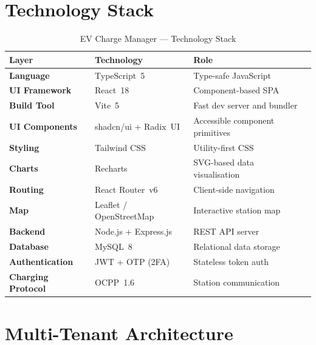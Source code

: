 \documentclass[12pt,a4paper]{report}
\begin{document}
\section{Technology Stack}

\begin{table}[h!]
  \centering
  \caption{EV Charge Manager --- Technology Stack}
  \label{tab:tech-stack}
  \renewcommand{\arraystretch}{1.3}
  \begin{tabular}{>{\bfseries}p{3.8cm} p{4cm} p{5.5cm}}
    \toprule
    Layer              & Technology            & Role \\
    \midrule
    Language           & TypeScript~5          & Type-safe JavaScript~\autocite{typescript_docs} \\
    UI Framework       & React~18              & Component-based SPA~\autocite{react_docs} \\
    Build Tool         & Vite~5                & Fast dev server and bundler~\autocite{vite_docs} \\
    UI Components      & shadcn/ui + Radix~UI  & Accessible component primitives \\
    Styling            & Tailwind CSS          & Utility-first CSS~\autocite{tailwindcss_docs} \\
    Charts             & Recharts              & SVG-based data visualisation~\autocite{recharts_docs} \\
    Routing            & React Router~v6       & Client-side navigation~\autocite{reactrouter_docs} \\
    Map                & Leaflet / OpenStreetMap & Interactive station map \\
    Backend            & Node.js + Express.js  & REST API server~\autocite{nodejs_express} \\
    Database           & MySQL~8               & Relational data storage~\autocite{mysql_docs} \\
    Authentication     & JWT + OTP (2FA)       & Stateless token auth~\autocite{rfc7519} \\
    Charging Protocol  & OCPP~1.6              & Station communication~\autocite{ocpp16_ed2} \\
    \bottomrule
  \end{tabular}
\end{table}

\section{Multi-Tenant Architecture}
\end{document}
